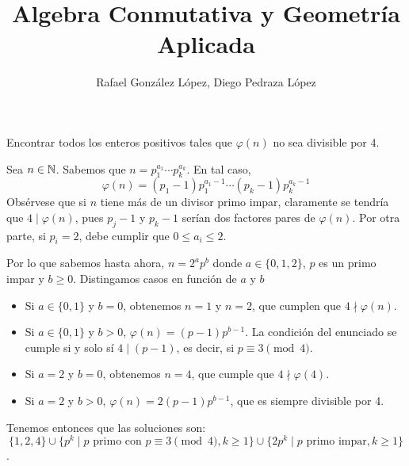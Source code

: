 \documentclass[twoside]{article}
\begin{document}
\title{Algebra Conmutativa y Geometría Aplicada}
\author{Rafael González López, Diego Pedraza López}
\maketitle

\begin{ejercicio}{1}
Encontrar todos los enteros positivos tales que $\varphi(n)$ no sea divisible por 4.
\begin{solucion}
Sea $n\in \mathbb{N}$. Sabemos que $n=p_1^{a_1}\cdots p_k^{a_k}$. En tal caso, 
\[
\varphi(n) = (p_1-1)p_1^{a_1-1}\cdots(p_k-1)p_k^{a_k-1}
\]
Obsérvese que si $n$ tiene más de un divisor primo impar, claramente se tendría que $4\mid \varphi(n)$, pues $p_j -1$ y $p_k-1$ serían dos factores pares de $\varphi(n)$. Por otra parte, si $p_i=2$, debe cumplir que $0\leq a_i \leq 2$. 

Por lo que sabemos hasta ahora, $n = 2^a p^b$ donde $a\in\{0,1,2\}$, $p$ es un primo impar y $b\geq 0$. Distingamos casos en función de $a$ y $b$
\begin{itemize}
\item Si $a \in \{0,1\}$ y $b = 0$, obtenemos $n=1$ y $n=2$, que cumplen que $4 \nmid φ(n)$.
\item Si $a \in \{0,1\}$ y $b > 0$, $\varphi(n) = (p-1)p^{b-1}$. La condición del enunciado se cumple si y solo sí $4 \mid (p-1)$, es decir, si $p \equiv 3 \pmod 4$.
\item Si $a=2$ y $b = 0$, obtenemos $n=4$, que cumple que $4 \nmid φ(4)$.
\item Si $a=2$ y $b > 0$, $\varphi(n)=2(p-1)p^{b-1}$, que es siempre divisible por 4.
\end{itemize}
Tenemos entonces que las soluciones son:
\[ \{1,2,4\} \cup \{p^k \mid p\text{ primo con } p \equiv 3 \pmod 4, k≥1\} \cup \{2p^k \mid p\text{ primo impar}, k ≥ 1\} \].
\end{solucion}
\end{ejercicio}

\newpage
\end{document}
